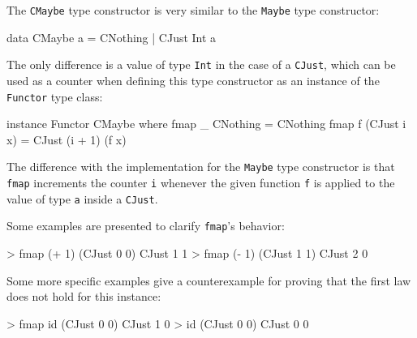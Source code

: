 




\begin{example}

  The \texttt{CMaybe} type
  constructor is very similar to the \texttt{Maybe} type constructor:
  \begin{codehaskell}
    data CMaybe a = CNothing | CJust Int a
  \end{codehaskell}
  The only difference is a value of type \texttt{Int} in the case of a
  \texttt{CJust}, which can be used as a counter when defining this
  type constructor as an instance of the \texttt{Functor} type class:
  \begin{codehaskell}
    instance Functor CMaybe where
      fmap _ CNothing    = CNothing
      fmap f (CJust i x) = CJust (i + 1) (f x)
  \end{codehaskell}
  The difference with the implementation for the \texttt{Maybe} type
  constructor is that \texttt{fmap} increments the counter \texttt{i}
  whenever the given function \texttt{f} is applied to the value of
  type \texttt{a} inside a \texttt{CJust}.

  Some examples are presented to clarify \texttt{fmap}'s behavior:
  \begin{codehaskell}
    > fmap (+ 1) (CJust 0 0)
    CJust 1 1
    > fmap (- 1) (CJust 1 1)
    CJust 2 0
  \end{codehaskell}

  Some more specific examples give a counterexample for proving that
  the first law does not hold for this instance:
  \begin{codehaskell}
    > fmap id (CJust 0 0)
    CJust 1 0
    > id (CJust 0 0)
    CJust 0 0
  \end{codehaskell}
\end{example}



